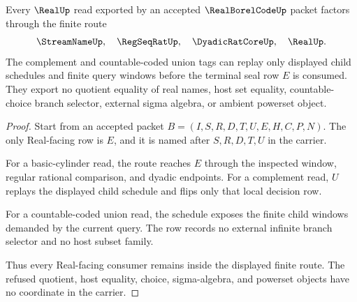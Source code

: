\begin{theorem}
\label{thm:real-borel-code-real-seal-nonescape}
Every $\RealUp$ read exported by an accepted $\RealBorelCodeUp$ packet factors through the finite route
$$
\StreamNameUp,\quad \RegSeqRatUp,\quad \DyadicRatCoreUp,\quad \RealUp .
$$
The complement and countable-coded union tags can replay only displayed child schedules and finite query windows before the terminal seal row $E$ is consumed. They export no quotient equality of real names, host set equality, countable-choice branch selector, external sigma algebra, or ambient powerset object.
\end{theorem}
\begin{proof}
Start from an accepted packet $B=(I,S,R,D,T,U,E,H,C,P,N)$. The only Real-facing row is $E$, and it is named after $S,R,D,T,U$ in the carrier.

For a basic-cylinder read, the route reaches $E$ through the inspected window, regular rational comparison, and dyadic endpoints. For a complement read, $U$ replays the displayed child schedule and flips only that local decision row.

For a countable-coded union read, the schedule exposes the finite child windows demanded by the current query. The row records no external infinite branch selector and no host subset family.

Thus every Real-facing consumer remains inside the displayed finite route. The refused quotient, host equality, choice, sigma-algebra, and powerset objects have no coordinate in the carrier.
\end{proof}




